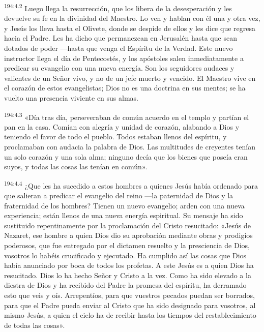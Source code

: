 \par 
\textsuperscript{194:4.2} Luego llega la resurrección, que los libera de la desesperación y les devuelve su fe en la divinidad del Maestro. Lo ven y hablan con él una y otra vez, y Jesús los lleva hasta el Olivete, donde se despide de ellos y les dice que regresa hacia el Padre. Les ha dicho que permanezcan en Jerusalén hasta que sean dotados de poder ---hasta que venga el Espíritu de la Verdad. Este nuevo instructor llega el día de Pentecostés, y los apóstoles salen inmediatamente a predicar su evangelio con una nueva energía. Son los seguidores audaces y valientes de un Señor vivo, y no de un jefe muerto y vencido. El Maestro vive en el corazón de estos evangelistas; Dios no es una doctrina en sus mentes; se ha vuelto una presencia viviente en sus almas.

\par 
\textsuperscript{194:4.3} «Día tras día, perseveraban de común acuerdo en el templo y partían el pan en la casa. Comían con alegría y unidad de corazón, alabando a Dios y teniendo el favor de todo el pueblo. Todos estaban llenos del espíritu, y proclamaban con audacia la palabra de Dios. Las multitudes de creyentes tenían un solo corazón y una sola alma; ninguno decía que los bienes que poseía eran suyos, y todas las cosas las tenían en común».

\par 
\textsuperscript{194:4.4} ¿Que les ha sucedido a estos hombres a quienes Jesús había ordenado para que salieran a predicar el evangelio del reino ---la paternidad de Dios y la fraternidad de los hombres? Tienen un nuevo evangelio; arden con una nueva experiencia; están llenos de una nueva energía espiritual. Su mensaje ha sido sustituido repentinamente por la proclamación del Cristo resucitado: «Jesús de Nazaret, ese hombre a quien Dios dio su aprobación mediante obras y prodigios poderosos, que fue entregado por el dictamen resuelto y la presciencia de Dios, vosotros lo habéis crucificado y ejecutado. Ha cumplido así las cosas que Dios había anunciado por boca de todos los profetas. A este Jesús es a quien Dios ha resucitado. Dios lo ha hecho Señor y Cristo a la vez. Como ha sido elevado a la diestra de Dios y ha recibido del Padre la promesa del espíritu, ha derramado esto que veis y oís. Arrepentíos, para que vuestros pecados puedan ser borrados, para que el Padre pueda enviar al Cristo que ha sido designado para vosotros, al mismo Jesús, a quien el cielo ha de recibir hasta los tiempos del restablecimiento de todas las cosas».

